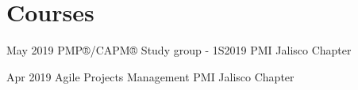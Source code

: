 
\section{Courses}

\dateitem
    {May 2019}
    {PMP®/CAPM® Study group - 1S2019}
    {PMI Jalisco Chapter}

\dateitem
    {Apr 2019}
    {Agile Projects Management}
    {PMI Jalisco Chapter}

